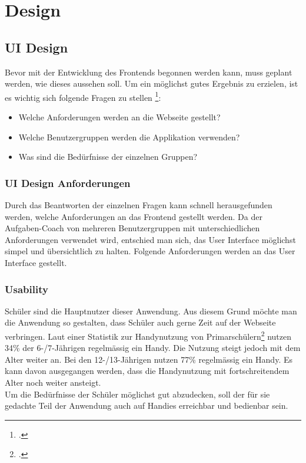 \section{Design}
\subsection{UI Design}
Bevor mit der Entwicklung des Frontends begonnen werden kann, muss geplant werden, wie dieses aussehen soll. Um ein möglichst gutes Ergebnis zu erzielen, ist es wichtig sich folgende Fragen zu stellen \footcite{ui_design_questions}:

\begin{itemize}
	\item Welche Anforderungen werden an die Webseite gestellt?
	\item Welche Benutzergruppen werden die Applikation verwenden?
	\item Was sind die Bedürfnisse der einzelnen Gruppen?
\end{itemize}

\subsubsection{UI Design Anforderungen}
Durch das Beantworten der einzelnen Fragen kann schnell herausgefunden werden, welche Anforderungen an das Frontend gestellt werden. Da der Aufgaben-Coach von mehreren Benutzergruppen mit unterschiedlichen Anforderungen verwendet wird, entschied man sich, das User Interface möglichst simpel und übersichtlich zu halten. Folgende Anforderungen werden an das User Interface gestellt.

\subsubsection*{Usability}
Schüler sind die Hauptnutzer dieser Anwendung. Aus diesem Grund möchte man die Anwendung so gestalten, dass Schüler auch gerne Zeit auf der Webseite verbringen. Laut einer Statistik zur Handynutzung von Primarschülern\footcite{smartphone_usage} nutzen 34\% der 6-/7-Jährigen regelmässig ein Handy. Die Nutzung steigt jedoch mit dem Alter weiter an. Bei den 12-/13-Jährigen nutzen 77\% regelmässig ein Handy. Es kann davon ausgegangen werden, dass die Handynutzung mit fortschreitendem Alter noch weiter ansteigt. \\

Um die Bedürfnisse der Schüler möglichst gut abzudecken, soll der für sie gedachte Teil der Anwendung auch auf Handies erreichbar und bedienbar sein.

